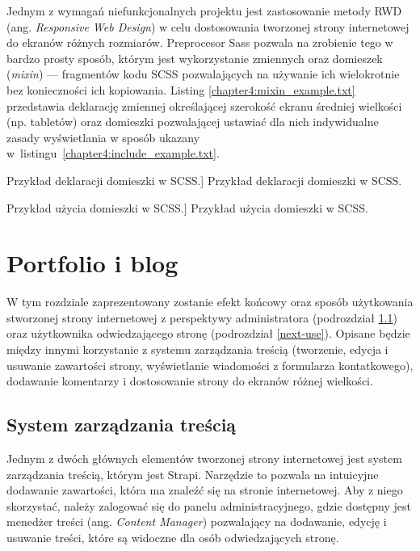 \documentclass[a4paper, 12pt, twoside]{article}
\numberwithin{figure}{section}
\begin{document}
\begin{sloppypar}
Jednym z wymagań niefunkcjonalnych projektu jest zastosowanie metody RWD (ang. \textit{Responsive Web Design}) w celu dostosowania tworzonej strony internetowej do ekranów różnych rozmiarów. Preprocesor Sass pozwala na zrobienie tego w bardzo prosty sposób, którym jest wykorzystanie zmiennych oraz domieszek (\textit{mixin}) --- fragmentów kodu SCSS pozwalających na używanie ich wielokrotnie bez konieczności ich kopiowania. Listing \ref{chapter4:mixin_example.txt} przedstawia deklarację zmiennej określającej szerokość ekranu średniej wielkości (np. tabletów) oraz domieszki pozwalającej ustawiać dla nich indywidualne zasady wyświetlania w sposób ukazany w~listingu~\ref{chapter4:include_example.txt}. 

\begin{code}[htbp]
    
    \caption
    [Przykład deklaracji domieszki w SCSS.]
    {Przykład deklaracji domieszki w SCSS.}
    \label{chapter4:mixin_example.txt}
\end{code}

\begin{code}[htbp]
    
    \caption
    [Przykład użycia domieszki w SCSS.]
    {Przykład użycia domieszki w SCSS.}
    \label{chapter4:include_example.txt}
\end{code}


\clearpage
\section{Portfolio i blog}

W tym rozdziale zaprezentowany zostanie efekt końcowy oraz sposób użytkowania stworzonej strony internetowej z perspektywy administratora (podrozdział \ref{strapi-use}) oraz użytkownika odwiedzającego stronę (podrozdział \ref{next-use}). Opisane będzie między innymi korzystanie z systemu zarządzania treścią (tworzenie, edycja i usuwanie zawartości strony, wyświetlanie wiadomości z formularza kontatkowego), dodawanie komentarzy i dostosowanie strony do ekranów różnej wielkości. 


\subsection{System zarządzania treścią} \label{strapi-use}

Jednym z dwóch głównych elementów tworzonej strony internetowej jest system zarządzania treścią, którym jest Strapi. Narzędzie to pozwala na intuicyjne dodawanie zawartości, która ma znaleźć się na stronie internetowej. Aby z niego skorzystać, należy zalogować się do panelu administracyjnego, gdzie dostępny jest menedżer treści (ang. \textit{Content Manager}) pozwalający na dodawanie, edycję i usuwanie treści, które są widoczne dla osób odwiedzających stronę. 


\end{sloppypar}
\end{document}
